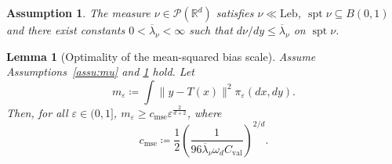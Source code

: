 \documentclass[10pt,a4paper]{amsart}
\newtheorem{assumption}{Assumption}
\newtheorem{lemma}{Lemma}
\newcommand{\Leb}{\mathrm{Leb}}
\newcommand{\R}{\mathbb{R}}
\DeclareMathOperator{\spt}{spt}
\begin{document}
\begin{assumption}\label{assu:nu}
The measure $\nu\in\mathcal{P}(\R^d)$ satisfies $\nu\ll\Leb$, $\spt\nu\subseteq B(0,1)$ and there exist constants $0<\overline\lambda_\nu<\infty$ such that $d\nu/dy\le\overline\lambda_\nu$ on $\spt\nu$.
\end{assumption}

\begin{lemma}[Optimality of the mean-squared bias scale]\label{lem:mse-lower-bound}
Assume Assumptions~\ref{assu:mu} and \ref{assu:nu} hold.
Let
\[
m_\varepsilon\coloneqq\int\|y-T(x)\|^2\pi_\varepsilon(dx,dy).
\]
Then, for all $\varepsilon\in(0,1]$, $m_\varepsilon\ge c_{\mathrm{mse}}\varepsilon^{\frac{2}{d+2}}$, where
\[
c_{\mathrm{mse}}\coloneqq\frac12\left(\frac{1}{96\overline\lambda_\nu\omega_d C_{\mathrm{val}}}\right)^{2/d}.
\]
\end{lemma}
\end{document}
